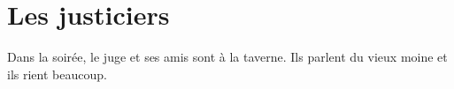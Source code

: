 \chapter{Les justiciers}
Dans la soirée, le juge et ses amis sont à la taverne. Ils parlent du vieux moine et ils rient beaucoup.

